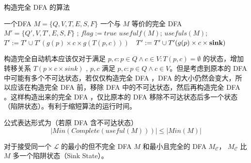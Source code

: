 \begin{algorithm}
    \caption{ 构造完全 DFA 的算法 }\label{al:complete-M}
    \begin{algorithmic}[1]
        \Require 一个DFA $M=\{Q,V,T,E,S,F\}$
        \Ensure 一个与 $M$ 等价的完全 DFA $M'=\{Q',V,T',E,S,F\}$
        \Statex {}
            ;
                         {$flag:=true$}
                    \EndIf
                \EndFor
            \EndFor
                \State $usefulf(M)$; 
                \State $usefuls(M)$; 
                            $T':= T' \cup T'(g(p)\times c \times g(T(p,c)))$
                        \Else
                            $~~T' := T' \cup T'(g(p)\times c \times \mbox{\bfseries sink})$
                        \EndIf
                    \EndFor
                \EndFor
            \EndIf
        \EndFunction
    \end{algorithmic}
\end{algorithm}

\begin{remark}
    构造完全自动机本应该仅对于满足 $ p,c:p\in Q \land c \in V: T(p,c)= \emptyset$ 的状态，增加转移关系 $T(p \times c \times sink)$ , $p,c$ 满足 $ p,c:p\in Q \land c \in V $。但是考虑到原本的 DFA 中可能有多个不可达状态，若仅仅构造完全 DFA ，DFA 的大小仍然会变大，所以应该在构造完全 DFA 前，移除 DFA 中的不可达状态，然后再构造完全 DFA 。这样构造出来的完全 DFA ，仅比原本的 DFA 移除不可达状态后多一个状态（陷阱状态）。有利于缩短算法的运行时间。
    
    公式表达形式为（若原 DFA 含不可达状态）
    \begin{equation}
        |Min(Complete( useful (M)))| \leq |Min(M)|
    \end{equation}
\end{remark}

\begin{remark}
    对于接受同一个 $\mathcal{L}$ 的最小的但不完全 DFA $M$ 和最小且完全的 DFA $M_{\mathcal{C}}$， $M_{\mathcal{C}}$ 比 $M$ 多一个陷阱状态（Sink State）\cite{watson1993taxonomyb}。
\end{remark}

